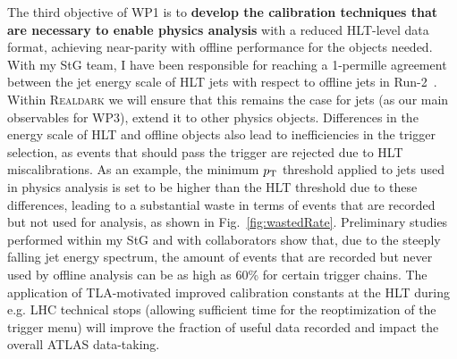The third objective of WP1 is to \textbf{develop the calibration techniques that are necessary to enable physics analysis} with a reduced HLT-level data format, achieving near-parity with offline performance for the objects needed. 
With my StG team, I have been responsible for reaching a 1-permille agreement between the jet energy scale of HLT jets with respect to offline jets in Run-2~\cite{Aaboud:2018fzt}.%
Within \textsc{Realdark} we will ensure that this remains the case for jets (as our main observables for WP3), extend it to other physics objects. 
Differences in the energy scale of HLT and offline objects also lead to inefficiencies in the trigger selection, as events that should pass the trigger are rejected due to HLT miscalibrations. 
As an example, the minimum $p_{\rm{T}}$ threshold applied to jets used in physics analysis is set to be higher than the HLT threshold due to these differences, leading to a substantial waste in terms of events that are recorded but not used for analysis, as shown in Fig.~\ref{fig:wastedRate}. 
Preliminary studies performed within my StG and with collaborators show that, due to the steeply falling jet energy spectrum, the amount of events that are recorded but never used by offline analysis can be as high as 60\% for certain trigger chains. 
The application of TLA-motivated improved calibration constants at the HLT during e.g. LHC technical stops (allowing sufficient time for the reoptimization of the trigger menu) will improve the fraction of useful data recorded and impact the overall ATLAS data-taking. 

